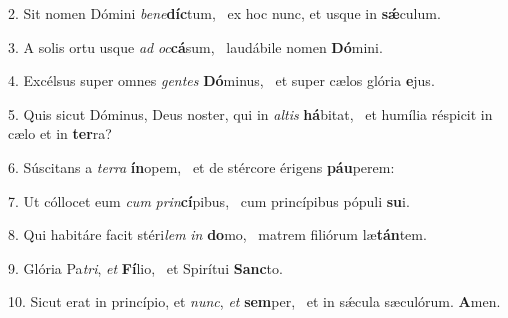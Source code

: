 2. Sit nomen Dómini \textit{be}\textit{ne}\textbf{díc}tum, \ast\  ex hoc nunc, et usque in \textbf{sǽ}culum.\

3. A solis ortu usque \textit{ad} \textit{oc}\textbf{cá}sum, \ast\  laudábile nomen \textbf{Dó}mini.\

4. Excélsus super omnes \textit{gen}\textit{tes} \textbf{Dó}minus, \ast\  et super cælos glória \textbf{e}jus.\

5. Quis sicut Dóminus, Deus noster, qui in \textit{al}\textit{tis} \textbf{há}bitat, \ast\  et humília réspicit in cælo et in \textbf{ter}ra?\

6. Súscitans a \textit{ter}\textit{ra} \textbf{ín}opem, \ast\  et de stércore érigens \textbf{páu}perem:\

7. Ut cóllocet eum \textit{cum} \textit{prin}\textbf{cí}pibus, \ast\  cum princípibus pópuli \textbf{su}i.\

8. Qui habitáre facit stéri\textit{lem} \textit{in} \textbf{do}mo, \ast\  matrem filiórum læ\textbf{tán}tem.\

9. Glória Pa\textit{tri}, \textit{et} \textbf{Fí}lio, \ast\  et Spirítui \textbf{Sanc}to.\

10. Sicut erat in princípio, et \textit{nunc}, \textit{et} \textbf{sem}per, \ast\  et in sǽcula sæculórum. \textbf{A}men.\

